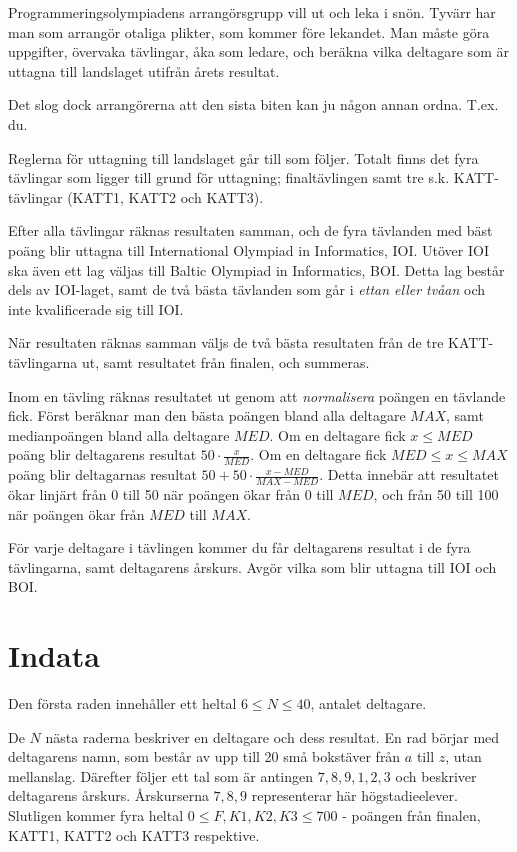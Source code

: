 Programmeringsolympiadens arrangörsgrupp vill ut och leka i snön.
Tyvärr har man som arrangör otaliga plikter, som kommer före lekandet.
Man måste göra uppgifter, övervaka tävlingar, åka som ledare, och beräkna vilka deltagare som är uttagna till landslaget utifrån årets resultat.

Det slog dock arrangörerna att den sista biten kan ju någon annan ordna.
T.ex. du.

Reglerna för uttagning till landslaget går till som följer.
Totalt finns det fyra tävlingar som ligger till grund för uttagning; finaltävlingen samt tre s.k. KATT-tävlingar (KATT1, KATT2 och KATT3).

Efter alla tävlingar räknas resultaten samman, och de fyra tävlanden med bäst poäng blir uttagna till International Olympiad in Informatics, IOI.
Utöver IOI ska även ett lag väljas till Baltic Olympiad in Informatics, BOI.
Detta lag består dels av IOI-laget, samt de två bästa tävlanden som går i \emph{ettan eller tvåan} och inte kvalificerade sig till IOI.

När resultaten räknas samman väljs de två bästa resultaten från de tre KATT-tävlingarna ut, samt resultatet från finalen, och summeras.

Inom en tävling räknas resultatet ut genom att \emph{normalisera} poängen en tävlande fick.
Först beräknar man den bästa poängen bland alla deltagare $MAX$, samt medianpoängen bland alla deltagare $MED$.
Om en deltagare fick $x \le MED$ poäng blir deltagarens resultat $50 \cdot \frac{x}{MED}$.
Om en deltagare fick $MED \le x \le MAX$ poäng blir deltagarnas resultat $50 + 50 \cdot \frac{x - MED}{MAX - MED}$.
Detta innebär att resultatet ökar linjärt från 0 till 50 när poängen ökar från 0 till $MED$,
och från 50 till 100 när poängen ökar från $MED$ till $MAX$.

För varje deltagare i tävlingen kommer du får deltagarens resultat i de fyra tävlingarna, samt deltagarens årskurs. Avgör vilka som blir uttagna till IOI och BOI.

\section*{Indata}
Den första raden innehåller ett heltal $6 \le N \le 40$, antalet deltagare.

De $N$ nästa raderna beskriver en deltagare och dess resultat.
En rad börjar med deltagarens namn, som består av upp till 20 små bokstäver från $a$ till $z$, utan mellanslag.
Därefter följer ett tal som är antingen $7, 8, 9, 1, 2, 3$ och beskriver deltagarens årskurs. Årskurserna $7, 8, 9$ representerar här högstadieelever.
Slutligen kommer fyra heltal $0 \le F, K1, K2, K3 \le 700$ - poängen från finalen, KATT1, KATT2 och KATT3 respektive.

